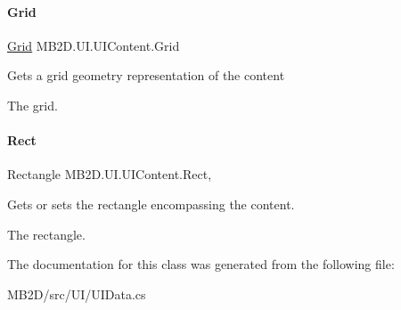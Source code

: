 \paragraph{\texorpdfstring{Grid}{Grid}}
{\footnotesize\ttfamily \hyperlink{class_m_b2_d_1_1_geometry_1_1_grid}{Grid} M\+B2\+D.\+U\+I.\+U\+I\+Content.\+Grid\hspace{0.3cm}{\ttfamily [get]}}



Gets a grid geometry representation of the content 

The grid.\hypertarget{class_m_b2_d_1_1_u_i_1_1_u_i_content_af2f7f9e8f8944afab658b3a1f2f94cd0}{}\label{class_m_b2_d_1_1_u_i_1_1_u_i_content_af2f7f9e8f8944afab658b3a1f2f94cd0} 
\paragraph{\texorpdfstring{Rect}{Rect}}
{\footnotesize\ttfamily Rectangle M\+B2\+D.\+U\+I.\+U\+I\+Content.\+Rect\hspace{0.3cm}{\ttfamily [get]}, {\ttfamily [set]}}



Gets or sets the rectangle encompassing the content. 

The rectangle.

The documentation for this class was generated from the following file\+:\begin{DoxyCompactItemize}
\item 
M\+B2\+D/src/\+U\+I/U\+I\+Data.\+cs\end{DoxyCompactItemize}
